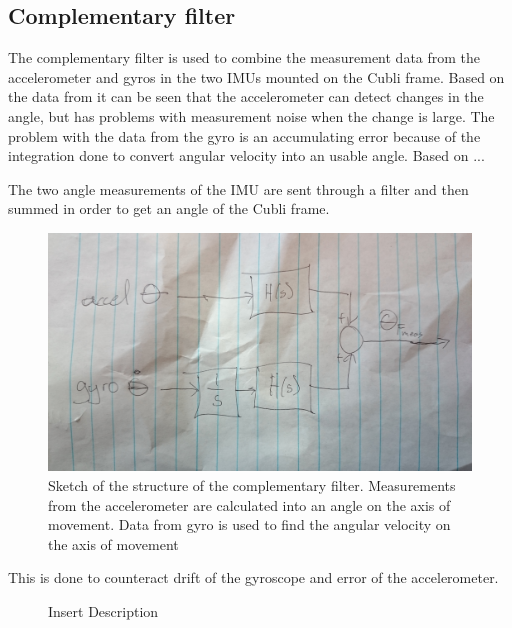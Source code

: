 \subsection{Complementary filter}
The complementary filter is used to combine the measurement data from the accelerometer and gyros in the two IMUs mounted on the Cubli frame. 
Based on the data from  it can be seen that the accelerometer can detect changes in the angle, but has problems with measurement noise when the change is large. The problem with the data from the gyro is an accumulating error because of the integration done to convert angular velocity into an usable angle.
Based on ... 

The two angle measurements of the IMU are sent through a filter and then summed in order to get an angle of the Cubli frame.

 
\begin{figure}[H] 
	\centering
	\includegraphics[scale=0.08]{figures/tempComplementaryFilter}
	\caption{Sketch of the structure of the complementary filter. Measurements from the accelerometer are calculated into an angle on the axis of movement. Data from gyro is used to find the angular velocity on the axis of movement}
	\label{blockComplementaryFilter}
\end{figure}
This is done to counteract drift of the gyroscope and error of the accelerometer. 

\begin{figure}[H]
	
	\centering
	\caption{Insert Description}
	\label{blockDrawingComplementaryFilter}
\end{figure}
